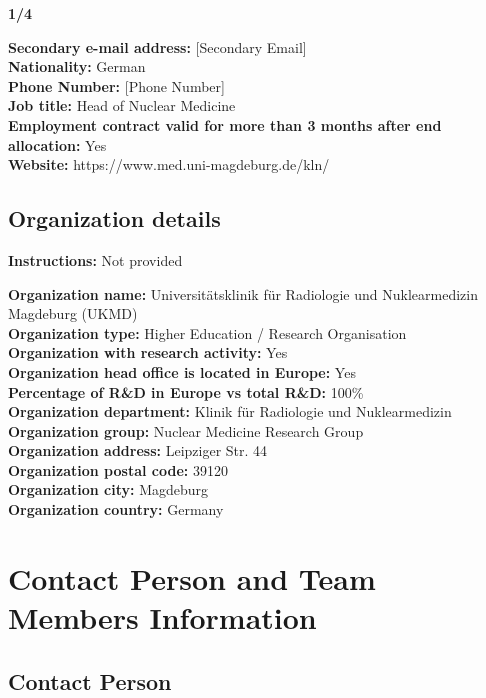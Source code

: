 \documentclass[11pt, a4paper]{article}
\begin{document}
\vspace{0.5em}
\noindent\textbf{1/4}

\vspace{0.5em}
\noindent\textbf{Secondary e-mail address:} [Secondary Email] \\
\textbf{Nationality:} German \\
\textbf{Phone Number:} [Phone Number] \\
\textbf{Job title:} Head of Nuclear Medicine \\
\textbf{Employment contract valid for more than 3 months after end allocation:} Yes \\
\textbf{Website:} https://www.med.uni-magdeburg.de/kln/

\subsection*{Organization details}

\noindent\textbf{Instructions:} Not provided

\vspace{0.5em}
\noindent\textbf{Organization name:} Universitätsklinik für Radiologie und Nuklearmedizin Magdeburg (UKMD) \\
\textbf{Organization type:} Higher Education / Research Organisation \\
\textbf{Organization with research activity:} Yes \\
\textbf{Organization head office is located in Europe:} Yes \\
\textbf{Percentage of R\&D in Europe vs total R\&D:} 100\% \\
\textbf{Organization department:} Klinik für Radiologie und Nuklearmedizin \\
\textbf{Organization group:} Nuclear Medicine Research Group \\
\textbf{Organization address:} Leipziger Str. 44 \\
\textbf{Organization postal code:} 39120 \\
\textbf{Organization city:} Magdeburg \\
\textbf{Organization country:} Germany

\section*{Contact Person and Team Members Information}

\subsection*{Contact Person}
\end{document}
